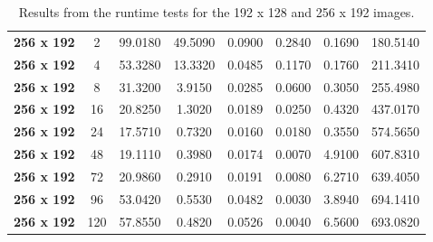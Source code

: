 \documentclass[11pt, a4paper]{article}
\begin{document}
\begin{table}
\begin{tabular}{|c|c|c|c|c|c|c|c|}
				\textbf{256 x 192} & 2     & 99.0180 & 49.5090 & 0.0900 & 0.2840 & 0.1690 & 180.5140 \\
				\textbf{256 x 192} & 4     & 53.3280 & 13.3320 & 0.0485 & 0.1170 & 0.1760 & 211.3410 \\
				\textbf{256 x 192} & 8     & 31.3200 & 3.9150 & 0.0285 & 0.0600 & 0.3050 & 255.4980 \\
				\textbf{256 x 192} & 16    & 20.8250 & 1.3020 & 0.0189 & 0.0250 & 0.4320 & 437.0170 \\
				\textbf{256 x 192} & 24    & 17.5710 & 0.7320 & 0.0160 & 0.0180 & 0.3550 & 574.5650 \\
				\textbf{256 x 192} & 48    & 19.1110 & 0.3980 & 0.0174 & 0.0070 & 4.9100 & 607.8310 \\
				\textbf{256 x 192} & 72    & 20.9860 & 0.2910 & 0.0191 & 0.0080 & 6.2710 & 639.4050 \\
				\textbf{256 x 192} & 96    & 53.0420 & 0.5530 & 0.0482 & 0.0030 & 3.8940 & 694.1410 \\
				\textbf{256 x 192} & 120   & 57.8550 & 0.4820 & 0.0526 & 0.0040 & 6.5600 & 693.0820 \\
				\hline
			\end{tabular}
		  \caption{Results from the runtime tests for the 192 x 128 and 256 x 192 images.}
		  \label{tab:all_data1}
		  
		\end{table}	
\end{document}
